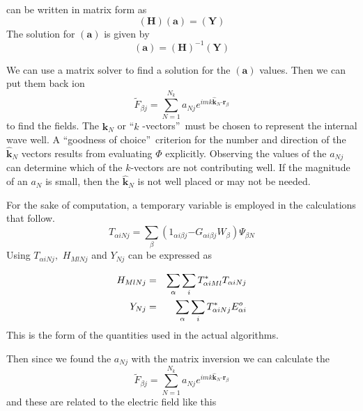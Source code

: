 \documentclass{article}
\begin{document}
can be written in matrix form as 
\begin{equation}
\left( \mathbf{H}\right) \left( \mathbf{a}\right) =\left( \mathbf{Y}\right)
\label{HaY}
\end{equation}%
The solution for $\left( \mathbf{a}\right) $ is given by 
\begin{equation}
\left( \mathbf{a}\right) =\left( \mathbf{H}\right) ^{-1}\left( \mathbf{Y}%
\right)  \label{aHY1}
\end{equation}

We can use a matrix solver to find a solution for the $\left( \mathbf{a}%
\right) $ values. Then we can put them back ion 
\begin{equation}
\tilde{F}_{\beta j}\mathbf{=}\sum_{N=1}^{N_{k}}a_{Nj}e^{imk\mathbf{\hat{k}}%
_{N}\mathbf{\cdot r}_{\beta }}  \label{Ftilde}
\end{equation}%
to find the fields. The $\mathbf{\hat{k}}_{N}$ or \textquotedblleft $k$%
-vectors\textquotedblright\ must be chosen to represent the internal wave
well. A \textquotedblleft goodness of choice\textquotedblright\ criterion
for the number and direction of the $\mathbf{\hat{k}}_{N}$ vectors results
from evaluating $\Phi $ explicitly. Observing the values of the $a_{Nj}$ can
determine which of the $k$-vectors are not contributing well. If the
magnitude of an $a_{N}$ is small, then the $\mathbf{\hat{k}}_{N}$ is not
well placed or may not be needed.

For the sake of computation, a temporary variable is employed in the
calculations that follow. 
\begin{equation}
T_{\alpha iNj}=\sum_{\beta }\left( 1_{\alpha i\beta j}\mathbf{-}G_{\alpha
i\beta j}W_{\beta }\right) \Psi _{\beta N}
\end{equation}
Using $T_{\alpha iNj},$ $H_{MlNj}$ and $Y_{Nj}$ can be expressed as

\begin{eqnarray}
H_{MlNj} &=&\sum_{\alpha }\sum_{i}T_{\alpha iMl}^{\ast }T_{\alpha iNj} \\
Y_{Nj} &=&\sum_{\alpha }\sum_{i}T_{\alpha iNj}^{\ast }E_{\alpha i}^{o} 
\notag
\end{eqnarray}%
This is the form of the quantities used in the actual algorithms.

Then since we found the $a_{Nj}$ with the matrix inversion we can calculate
the 
\begin{equation}
\tilde{F}_{\beta j}\mathbf{=}\sum_{N=1}^{N_{k}}a_{Nj}e^{imk\mathbf{\hat{k}}%
_{N}\mathbf{\cdot r}_{\beta }}
\end{equation}%
and these are related to the electric field like this
\end{document}

